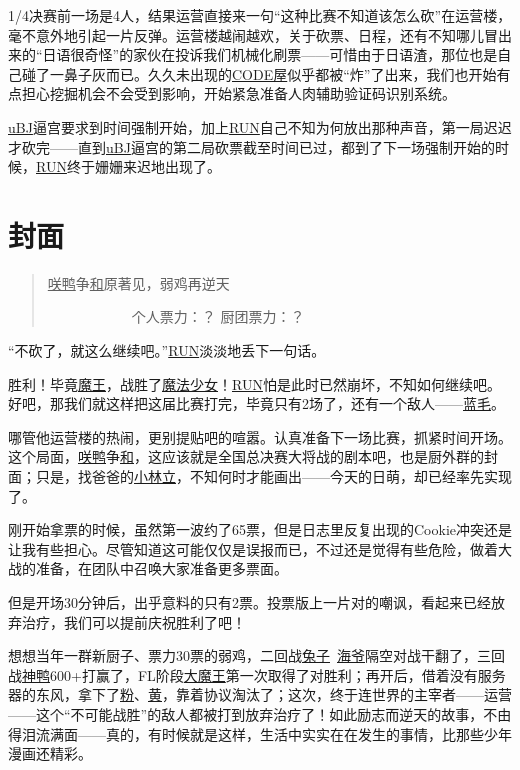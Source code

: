 1/4决赛前一场是4人，结果运营直接来一句“这种比赛不知道该怎么砍”在运营楼，毫不意外地引起一片反弹。运营楼越闹越欢，关于砍票、日程，还有不知哪儿冒出来的“日语很奇怪”的家伙在投诉我们机械化刷票——可惜由于日语渣，那位也是自己碰了一鼻子灰而已。久久未出现的\uline{CODE屋}似乎都被“炸”了出来，我们也开始有点担心挖掘机会不会受到影响，开始紧急准备人肉辅助验证码识别系统。

\uline{uBJ}逼宫要求到时间强制开始，加上\uline{RUN}自己不知为何放出那种声音，第一局迟迟才砍完——直到\uline{uBJ}逼宫的第二局砍票截至时间已过，都到了下一场强制开始的时候，\uline{RUN}终于姗姗来迟地出现了。

\chapter{封面}
\begin{quote}
\uline{咲}\uline{鸭}争\uline{和}原著见，弱鸡再逆天

　　　　　　个人票力：？ 厨团票力：？
\end{quote}

“不砍了，就这么继续吧。”\uline{RUN}淡淡地丢下一句话。

胜利！毕竟\uline{魔王}，战胜了\uline{魔法少女}！\uline{RUN}怕是此时已然崩坏，不知如何继续吧。好吧，那我们就这样把这届比赛打完，毕竟只有2场了，还有一个敌人——\uline{蓝毛}。

哪管他运营楼的热闹，更别提贴吧的喧嚣。认真准备下一场比赛，抓紧时间开场。这个局面，\uline{咲}\uline{鸭}争\uline{和}，这应该就是全国总决赛大将战的剧本吧，也是厨外群的封面；只是，找爸爸的\uline{小林立}，不知何时才能画出——今天的日萌，却已经率先实现了。

刚开始拿票的时候，虽然第一波约了65票，但是日志里反复出现的Cookie冲突还是让我有些担心。尽管知道这可能仅仅是误报而已，不过还是觉得有些危险，做着大战的准备，在团队中召唤大家准备更多票面。

但是开场30分钟后，出乎意料的只有2票。投票版上一片对的嘲讽，看起来已经放弃治疗，我们可以提前庆祝胜利了吧！

想想当年一群新厨子、票力30票的弱鸡，二回战\uline{兔子}~\uline{海爷}隔空对战干翻了，三回战\uline{神鸭}600+打赢了，FL阶段\uline{大魔王}第一次取得了对胜利；再开后，借着没有服务器的东风，拿下了\uline{粉}、\uline{黄}，靠着协议淘汰了；这次，终于连世界的主宰者——运营——这个“不可能战胜”的敌人都被打到放弃治疗了！如此励志而逆天的故事，不由得泪流满面——真的，有时候就是这样，生活中实实在在发生的事情，比那些少年漫画还精彩。

